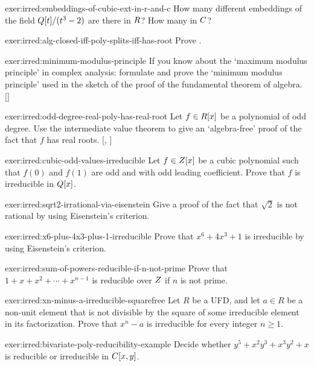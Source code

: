 \begin{exer}{}{exer:irred:embeddings-of-cubic-ext-in-r-and-c}
  How many different embeddings of the field $Q[t]/(t^3 - 2)$ are
  there in $R$? How many in $C$?
\end{exer}
\begin{exer}{}{exer:irred:alg-closed-iff-poly-splits-iff-has-root}
  Prove .
\end{exer}
\begin{exer}{}{exer:irred:minimum-modulus-principle}
  \exerused{} If you know about the `maximum modulus principle' in
  complex analysis: formulate and prove the `minimum modulus
  principle' used in the sketch of the proof of the fundamental
  theorem of
  algebra. []
\end{exer}
\begin{exer}{}{exer:irred:odd-degree-real-poly-has-real-root}
  \exerused{} Let $f \in R[x]$ be a polynomial of odd degree. Use the
  intermediate value theorem to give an `algebra-free' proof of the
  fact that $f$ has real
  roots. [,
  ]
\end{exer}
\begin{exer}{}{exer:irred:cubic-odd-values-irreducible}
  Let $f \in Z[x]$ be a cubic polynomial such that $f(0)$ and $f(1)$
  are odd and with odd leading coefficient. Prove that $f$ is
  irreducible in $Q[x]$.
\end{exer}
\begin{exer}{}{exer:irred:sqrt2-irrational-via-eisenstein}
  Give a proof of the fact that $\sqrt{2}$ is not rational by using
  Eisenstein's criterion.
\end{exer}
\begin{exer}{}{exer:irred:x6-plus-4x3-plus-1-irreducible}
  Prove that $x^6 + 4x^3 + 1$ is irreducible by using Eisenstein's
  criterion.
\end{exer}
\begin{exer}{}{exer:irred:sum-of-powers-reducible-if-n-not-prime}
  Prove that $1 + x + x^2 + \cdots + x^{n-1}$ is reducible over $Z$
  if $n$ is not prime.
\end{exer}
\begin{exer}{}{exer:irred:xn-minus-a-irreducible-squarefree}
  Let $R$ be a UFD, and let $a \in R$ be a non-unit element that is
  not divisible by the square of some irreducible element in its
  factorization. Prove that $x^n - a$ is irreducible for every integer
  $n \geq 1$.
\end{exer}
\begin{exer}{}{exer:irred:bivariate-poly-reducibility-example}
  Decide whether $y^5 + x^2 y^3 + x^3 y^2 + x$ is reducible or
  irreducible in $C[x, y]$.
\end{exer}

